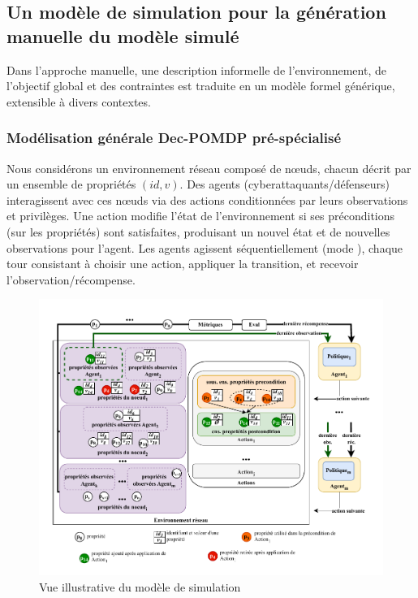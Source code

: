 \subsection{Un modèle de simulation pour la génération manuelle du modèle simulé}

Dans l'approche manuelle, une description informelle de l'environnement, de l'objectif global et des contraintes est traduite en un modèle formel générique, extensible à divers contextes.

\subsubsection{Modélisation générale Dec-POMDP pré-spécialisé}

Nous considérons un environnement réseau composé de nœuds, chacun décrit par un ensemble de propriétés $(id, v)$. Des agents (cyberattaquants/défenseurs) interagissent avec ces nœuds via des actions conditionnées par leurs observations et privilèges. Une action modifie l'état de l'environnement si ses préconditions (sur les propriétés) sont satisfaites, produisant un nouvel état et de nouvelles observations pour l'agent. Les agents agissent séquentiellement (mode ), chaque tour consistant à choisir une action, appliquer la transition, et recevoir l'observation/récompense.

\begin{figure}[h!]
  \centering
  \includegraphics[trim=0.7cm 0.6cm 0.7cm 1cm, clip,width=1\textwidth]{figures/model_example_illustration.pdf}
  \caption{Vue illustrative du modèle de simulation}
  \label{fig:model_example_illustration}
\end{figure}

